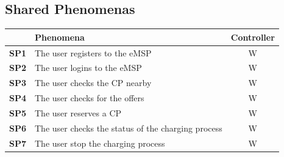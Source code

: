 \documentclass{Configuration_Files/PoliMi3i_thesis}
\begin{document}
\subsection{Shared Phenomenas}

\begin{table}[H]
\centering 
    \begin{xltabular}{\textwidth}{| >{}p{3em}|X|c|}
    \hline
     & \textbf{Phenomena} & \textbf{Controller}\T\B \\
    \hline \hline
    \textbf{SP1} & The user registers to the eMSP & W\T\B\\
    \hline
    \textbf{SP2} & The user logins to the eMSP & W\T\B\\
    \hline
    \textbf{SP3} & The user checks the CP nearby & W\T\B\\
    \hline
    \textbf{SP4} & The user checks for the offers & W\B\\
    \hline
    \textbf{SP5} & The user reserves a CP & W\B\\
    \hline
    \textbf{SP6} & The user checks the status of the charging process & W\B\\
    \hline
    \textbf{SP7} & The user stop the charging process & W\B\\
    \hline
    

\end{xltabular}
\end{table}
\end{document}
